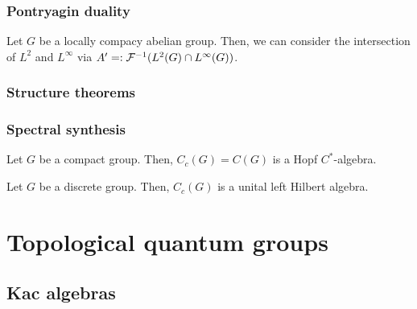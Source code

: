 \documentclass{../../large}
\begin{document}
\section{Pontryagin duality}

\begin{prb}
Let $G$ be a locally compacy abelian group.
Then, we can consider the intersection of $L^2$ and $L^\infty$ via $A'=:\mathcal{F}^{-1}(L^2(G)\cap L^\infty(G))$.
\end{prb}

\begin{prb}
\end{prb}
\begin{prb}
\end{prb}
\begin{prb}
\end{prb}


\section{Structure theorems}



\section{Spectral synthesis}








\begin{prb}
Let $G$ be a compact group.
Then, $C_c(G)=C(G)$ is a Hopf $C^*$-algebra.
\end{prb}

\begin{prb}
Let $G$ be a discrete group.
Then, $C_c(G)$ is a unital left Hilbert algebra.
\end{prb}




\part{Topological quantum groups}



\chapter{Kac algebras}
\end{document}
